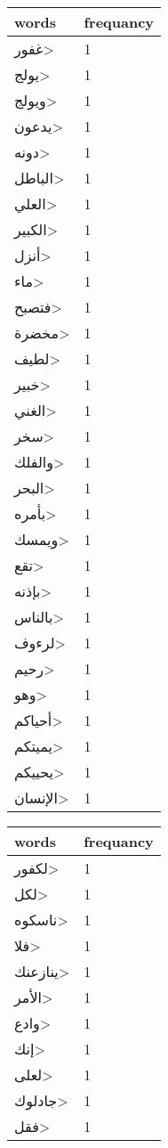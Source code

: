 \documentclass{article}
\begin{document}
\begin{multicols}{3}
\begin{center}
\begin{tabular}{ P{2cm}  P{1cm}}
\textbf{words}    & \textbf{frequancy}  \\
\hline
\<غفور> & 1 \\ 
\<يولج> & 1 \\ 
\<ويولج> & 1 \\ 
\<يدعون> & 1 \\ 
\<دونه> & 1 \\ 
\<الباطل> & 1 \\ 
\<العلي> & 1 \\ 
\<الكبير> & 1 \\ 
\<أنزل> & 1 \\ 
\<ماء> & 1 \\ 
\<فتصبح> & 1 \\ 
\<مخضرة> & 1 \\ 
\<لطيف> & 1 \\ 
\<خبير> & 1 \\ 
\<الغني> & 1 \\ 
\<سخر> & 1 \\ 
\<والفلك> & 1 \\ 
\<البحر> & 1 \\ 
\<بأمره> & 1 \\ 
\<ويمسك> & 1 \\ 
\<تقع> & 1 \\ 
\<بإذنه> & 1 \\ 
\<بالناس> & 1 \\ 
\<لرءوف> & 1 \\ 
\<رحيم> & 1 \\ 
\<وهو> & 1 \\ 
\<أحياكم> & 1 \\ 
\<يميتكم> & 1 \\ 
\<يحييكم> & 1 \\ 
\<الإنسان> & 1 \\ 
\end{tabular} 
\begin{tabular}{ P{2cm}  P{1cm}} 
\textbf{words}    & \textbf{frequancy}  \\
\hline
\<لكفور> & 1 \\ 
\<لكل> & 1 \\ 
\<ناسكوه> & 1 \\ 
\<فلا> & 1 \\ 
\<ينازعنك> & 1 \\ 
\<الأمر> & 1 \\ 
\<وادع> & 1 \\ 
\<إنك> & 1 \\ 
\<لعلى> & 1 \\ 
\<جادلوك> & 1 \\ 
\<فقل> & 1 \\ 

\end{tabular}
\end{center}
\end{multicols}
\end{document}
